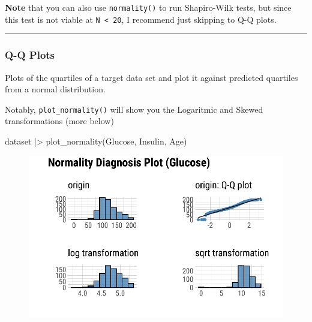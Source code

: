 \documentclass[
  letterpaper,
  DIV=11,
  numbers=noendperiod]{scrreprt}
\newenvironment{Shaded}{\begin{snugshade}}{\end{snugshade}}
\newcommand{\FunctionTok}[1]{\textcolor[rgb]{0.28,0.35,0.67}{#1}}
\newcommand{\NormalTok}[1]{\textcolor[rgb]{0.00,0.23,0.31}{#1}}
\newcommand{\SpecialCharTok}[1]{\textcolor[rgb]{0.37,0.37,0.37}{#1}}
\begin{document}
\textbf{Note} that you can also use \texttt{normality()} to run
Shapiro-Wilk tests, but since this test is not viable at
\texttt{N\ \textless{}\ 20}, I recommend just skipping to Q-Q plots.

\begin{center}\rule{0.5\linewidth}{0.5pt}\end{center}

\hypertarget{q-q-plots-2}{%
\subsubsection{Q-Q Plots}\label{q-q-plots-2}}

Plots of the quartiles of a target data set and plot it against
predicted quartiles from a normal distribution.

Notably, \texttt{plot\_normality()} will show you the Logaritmic and
Skewed transformations (more below)

\begin{Shaded}
\begin{Highlighting}[]
\NormalTok{dataset }\SpecialCharTok{|\textgreater{}}
\FunctionTok{plot\_normality}\NormalTok{(Glucose, Insulin, Age)}
\end{Highlighting}
\end{Shaded}

\begin{figure}[H]

{\centering \includegraphics{./TransformingLikeDataTrans_files/figure-pdf/unnamed-chunk-5-1.pdf}

}

\end{figure}
\end{document}
